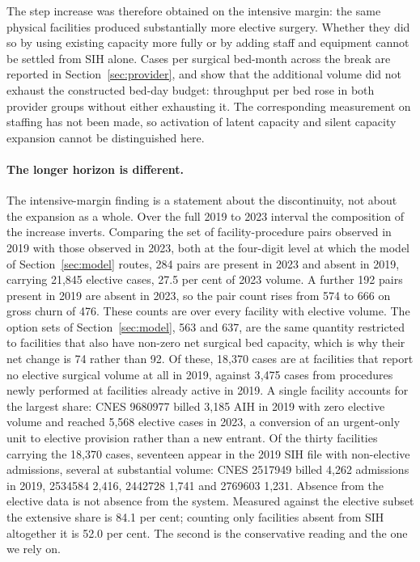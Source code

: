 The step increase was therefore obtained on the intensive margin: the same
physical facilities produced substantially more elective surgery. Whether they
did so by using existing capacity more fully or by adding staff and equipment
cannot be settled from SIH alone. Cases per surgical bed-month across the break
are reported in Section~\ref{sec:provider}, and show that the additional volume
did not exhaust the constructed bed-day budget: throughput per bed rose in both provider groups without either exhausting it. The corresponding measurement on
staffing has not been made, so activation of latent capacity and silent capacity
expansion cannot be distinguished here.

\paragraph{The longer horizon is different.} The intensive-margin finding is a
statement about the discontinuity, not about the expansion as a whole. Over the
full 2019 to 2023 interval the composition of the increase inverts. Comparing
the set of facility-procedure pairs observed in 2019 with those observed in
2023, both at the four-digit level at which the model of Section~\ref{sec:model}
routes, 284 pairs are present in 2023 and absent in 2019, carrying 21{,}845
elective cases, 27.5 per cent of 2023 volume. A further 192 pairs present in
2019 are absent in 2023, so the pair
count rises from 574 to 666 on gross churn of 476. These counts are over every
facility with elective volume. The option sets of Section~\ref{sec:model}, 563
and 637, are the same quantity restricted to facilities that also have non-zero
net surgical bed capacity, which is why their net change is 74 rather than 92. Of these, 18{,}370 cases are at facilities that report no elective
surgical volume at all in 2019, against 3{,}475 cases from procedures newly
performed at facilities already active in 2019.
A single facility accounts for the largest share: CNES 9680977 billed 3{,}185
AIH in 2019 with zero elective volume and reached 5{,}568 elective cases in
2023, a conversion of an urgent-only unit to elective provision rather than a
new entrant. Of the thirty facilities carrying the 18{,}370 cases, seventeen
appear in the 2019 SIH file with non-elective admissions, several at substantial
volume: CNES 2517949 billed 4{,}262 admissions in 2019, 2534584 2{,}416, 2442728
1{,}741 and 2769603 1{,}231. Absence from the elective data is not absence from
the system. Measured against the elective subset the extensive share is 84.1 per
cent; counting only facilities absent from SIH altogether it is 52.0 per cent.
The second is the
conservative reading and the one we rely on.

